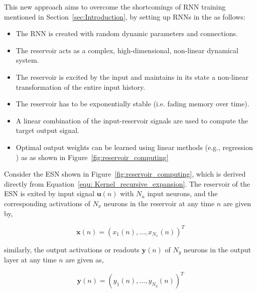 \documentclass{WitsPhysicsReport}
\begin{document}
This new approach aims to overcome the shortcomings of RNN training mentioned in Section~\ref{sec:Introduction}, by setting up RNNs in the as follows:
\begin{itemize}
\item The RNN is created with random dynamic parameters and connections.
\item The reservoir acts as a complex, high-dimensional, non-linear dynamical system.
\item The reservoir is excited by the input and maintains in its state a non-linear transformation of the entire input history.
\item The reservoir has to be exponentially stable (i.e. fading memory over time).
\item A linear combination of the input-reservoir signals are used to compute the target output signal.
\item Optimal output weights can be learned using linear methods (e.g., regression ) as as shown in Figure~\ref{fig:reservoir_computing}
\label{item:New_RRN_approach}
\end{itemize}



Consider the ESN shown in Figure~\ref{fig:reservoir_computing}, which is derived directly from Equation~\ref{equ: Kernel_recursive_expansion}. The reservoir of the ESN is exited by input signal $\textbf{u}(n)$ with $N_{u}$ input neurons, and the corresponding activations of $N_{x}$ neurons in the reservoir at any time $n$ are given by,

\begin{equation}
\textbf{x}(n) = (x_{1}(n),...,x_{N_{x}}(n))^{T}
\label{equ:state_vector}
\end{equation}

similarly, the output activations or readouts $\textbf{y}(n)$ of $N_{y}$ neurons in the output layer at any time $n$ are given as,

\begin{equation}
\textbf{y}(n) = (y_{1}(n),...,y_{N_{y}}(n))^{T} 
\label{equ:output_vector}
\end{equation}
\end{document}
